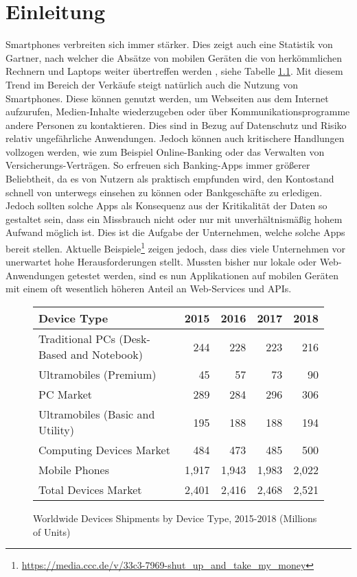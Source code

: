 \chapter{Einleitung}
Smartphones verbreiten sich immer stärker. Dies zeigt auch eine Statistik von Gartner, nach welcher die Absätze von mobilen Geräten die von herkömmlichen Rechnern und Laptops weiter übertreffen werden \cite{GartnerSales}, siehe Tabelle \ref{ref:GartnerSalesTable}. Mit diesem Trend im Bereich der Verkäufe steigt natürlich auch die Nutzung von Smartphones. Diese können genutzt werden, um Webseiten aus dem Internet aufzurufen, Medien-Inhalte wiederzugeben oder über Kommunikationsprogramme andere Personen zu kontaktieren. Dies sind in Bezug auf Datenschutz und Risiko relativ ungefährliche Anwendungen. Jedoch können auch kritischere Handlungen vollzogen werden, wie zum Beispiel Online-Banking oder das Verwalten von Versicherungs-Verträgen. So erfreuen sich Banking-Apps immer größerer Beliebtheit, da es von Nutzern als praktisch empfunden wird, den Kontostand schnell von unterwegs einsehen zu können oder Bankgeschäfte zu erledigen. Jedoch sollten solche Apps als Konsequenz aus der Kritikalität der Daten so gestaltet sein, dass ein Missbrauch nicht oder nur mit unverhältnismäßig hohem Aufwand möglich ist. Dies ist die Aufgabe der Unternehmen, welche solche Apps bereit stellen. Aktuelle Beispiele\footnote{\url{https://media.ccc.de/v/33c3-7969-shut_up_and_take_my_money}} zeigen jedoch, dass dies viele Unternehmen vor unerwartet hohe Herausforderungen stellt. Mussten bisher nur lokale oder Web-Anwendungen getestet werden, sind es nun Applikationen auf mobilen Geräten mit einem oft wesentlich höheren Anteil an Web-Services und APIs.\\

\begin{figure}[htbp]
	\centering
	\begin{tabular}{ l r r r r}
		Device Type & 2015 & 2016 & 2017 & 2018 \\ \hline
		Traditional PCs (Desk-Based and Notebook) & 244 & 228 & 223 & 216 \\
		Ultramobiles (Premium) & 45 & 57 & 73 & 90 \\
		PC Market & 289 & 284 & 296 & 306 \\
		Ultramobiles (Basic and Utility) & 195 & 188 & 188 & 194 \\
		Computing Devices Market & 484 & 473 & 485 & 500 \\
		Mobile Phones & 1,917 & 1,943 & 1,983 & 2,022 \\
		Total Devices Market & 2,401 & 2,416 & 2,468 & 2,521 \\
	\end{tabular}
	\caption{Worldwide Devices Shipments by Device Type, 2015-2018 (Millions of Units)\cite{GartnerSales}}
	\label{ref:GartnerSalesTable}
\end{figure}

